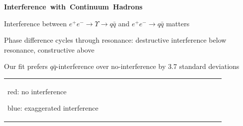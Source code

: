 \documentclass[landscape]{article}
\newenvironment{slide}[1][ ]{\mbox{\bf #1 } \vfill}{\vfill \mbox{ } \hfill \Large \arabic{page} \pagebreak}
\newcommand{\qqbar}{$q\bar{q}$}
\begin{document}
\begin{slide}[Interference with Continuum Hadrons]

Interference between $e^+e^- \to \Upsilon \to q\bar{q}$ and $e^+e^- \to q\bar{q}$ matters

\vfill
Phase difference cycles through resonance: destructive interference below resonance, \mbox{constructive} above

\vfill
Our fit prefers \qqbar-interference over no-interference by 3.7 standard deviations

\vfill
\begin{center}
\begin{tabular}{p{0.45\linewidth} p{0.45\linewidth}}
\begin{minipage}{\linewidth}
\vspace{1.5 cm}
{\color{red} red:} no interference

{\color{blue} blue:} exaggerated interference


\end{minipage}
\end{tabular}
\end{center}
\end{slide}
\end{document}

